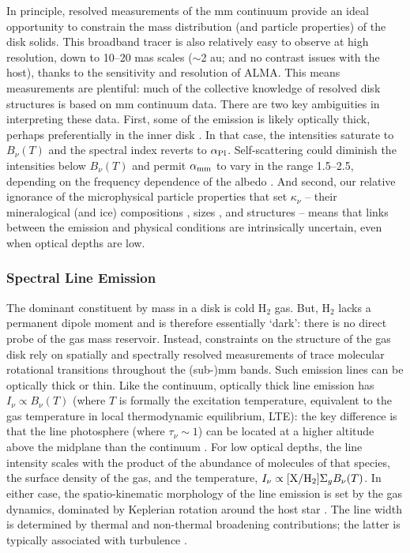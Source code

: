 \documentclass[a4paper]{ar-1col}
\begin{document}
In principle, resolved measurements of the mm continuum provide an ideal opportunity to constrain the mass distribution (and particle properties) of the disk solids.  This broadband tracer is also relatively easy to observe at high resolution, down to 10--20 mas scales ($\sim$2 au; and no contrast issues with the host), thanks to the sensitivity and resolution of ALMA.  This means measurements are plentiful: much of the collective knowledge of resolved disk structures is based on mm continuum data.  There are two key ambiguities in interpreting these data.  First, some of the emission is likely optically thick, perhaps preferentially in the inner disk \citep[see][]{beckwith90,aw05}.  In that case, the intensities saturate to $B_\nu(T)$ and the spectral index reverts to $\alpha_{\rm Pl}$.  Self-scattering could diminish the intensities below $B_\nu(T)$ and permit $\alpha_{\rm mm}$ to vary in the range 1.5--2.5, depending on the frequency dependence of the albedo \citep{zhu19,liu19}.  And second, our relative ignorance of the microphysical particle properties that set $\kappa_\nu$ -- their mineralogical (and ice) compositions \citep{pollack94}, sizes \citep{miyake93}, and structures \citep{henning96} -- means that links between the emission and physical conditions are intrinsically uncertain, even when optical depths are low.


\subsubsection{Spectral Line Emission} \label{sec:primer_lines}
The dominant constituent by mass in a disk is cold H$_2$ gas.  But, H$_2$ lacks a permanent dipole moment and is therefore essentially `dark': there is no direct probe of the gas mass reservoir.  Instead, constraints on the structure of the gas disk rely on spatially and spectrally resolved measurements of trace molecular rotational transitions throughout the (sub-)mm bands.  Such emission lines can be optically thick or thin.  Like the continuum, optically thick line emission has $I_\nu \propto B_\nu(T)$ (where $T$ is formally the excitation temperature, equivalent to the gas temperature in local thermodynamic equilibrium, LTE): the key difference is that the line photosphere (where $\tau_\nu \sim 1$) can be located at a higher altitude above the midplane than the continuum \citep{beckwith93}.  For low optical depths, the line intensity scales with the product of the abundance of molecules of that species, the surface density of the gas, and the temperature, $I_\nu \propto [{\rm X}/{\rm H}_2] \Sigma_g B_\nu(T)$.  In either case, the spatio-kinematic morphology of the line emission is set by the gas dynamics, dominated by Keplerian rotation around the host star \citep{marsh92,koerner93}.  The line width is determined by thermal and non-thermal broadening contributions; the latter is typically associated with turbulence \citep{hughes11}.         
\end{document}
